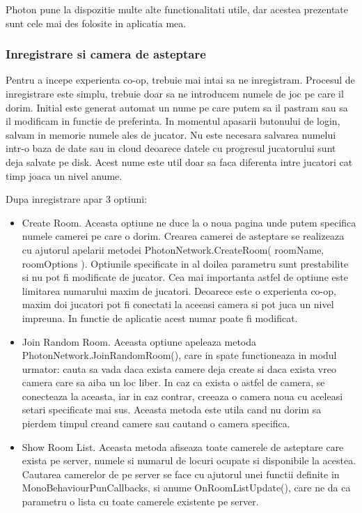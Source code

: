 \documentclass[12pt, a4paper]{article}
\begin{document}
	Photon pune la dispozitie multe alte functionalitati utile, dar acestea prezentate sunt cele mai des folosite in aplicatia mea.
	
	
	
	
	
	\subsubsection{Inregistrare si camera de asteptare}
	
	Pentru a incepe experienta co-op, trebuie mai intai sa ne inregistram. Procesul de inregistrare este simplu, trebuie doar sa ne introducem numele de joc pe care il dorim. Initial este generat automat un nume pe care putem sa il pastram sau sa il modificam in functie de preferinta. In momentul apasarii butonului de login, salvam in memorie numele ales de jucator. Nu este necesara salvarea numelui intr-o baza de date sau in cloud deoarece datele cu progresul jucatorului sunt deja salvate pe disk. Acest nume este util doar sa faca diferenta intre jucatori cat timp joaca un nivel anume.
	\newline
	
	Dupa inregistrare apar 3 optiuni:
	
	\begin{itemize}
		\item Create Room. Aceasta optiune ne duce la o noua pagina unde putem specifica numele camerei pe care o dorim. Crearea camerei de asteptare se realizeaza cu ajutorul apelarii metodei PhotonNetwork.CreateRoom( roomName, roomOptions ). Optiunile specificate in al doilea parametru sunt prestabilite si nu pot fi modificate de jucator. Cea mai importanta astfel de optiune este limitarea numarului maxim de jucatori. Deoarece este o experienta co-op, maxim doi jucatori pot fi conectati la aceeasi camera si pot juca un nivel impreuna. In functie de aplicatie acest numar poate fi modificat.
		\item Join Random Room. Aceasta optiune apeleaza metoda PhotonNetwork.JoinRandomRoom(), care in spate functioneaza in modul urmator: cauta sa vada daca exista camere deja create si daca exista vreo camera care sa aiba un loc liber. In caz ca exista o astfel de camera, se conecteaza la aceasta, iar in caz contrar, creeaza o camera noua cu aceleasi setari specificate mai sus. Aceasta metoda este utila cand nu dorim sa pierdem timpul creand camere sau cautand o camera specifica.
		\item Show Room List. Aceasta metoda afiseaza toate camerele de asteptare care exista pe server, numele si numarul de locuri ocupate si disponibile la acestea. Cautarea camerelor de pe server se face cu ajutorul unei functii definite in MonoBehaviourPunCallbacks, si anume OnRoomListUpdate(), care ne da ca parametru o lista cu toate camerele existente pe server.
	\end{itemize}
\end{document}
